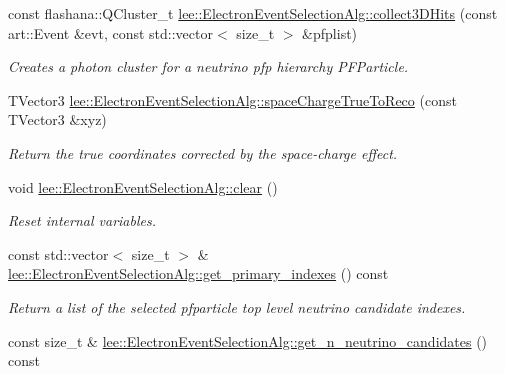\begin{DoxyCompactItemize}
const flashana\-::\-Q\-Cluster\-\_\-t \hyperlink{group__lee_ga06a3e470d9b2ca729d25822fac19e455}{lee\-::\-Electron\-Event\-Selection\-Alg\-::collect3\-D\-Hits} (const art\-::\-Event \&evt, const std\-::vector$<$ size\-\_\-t $>$ \&pfplist)
\begin{DoxyCompactList}\small\item\em Creates a photon cluster for a neutrino pfp hierarchy P\-F\-Particle. \end{DoxyCompactList}\item 
T\-Vector3 \hyperlink{group__lee_gafb99143e1546158d3f030724694e6a51}{lee\-::\-Electron\-Event\-Selection\-Alg\-::space\-Charge\-True\-To\-Reco} (const T\-Vector3 \&xyz)
\begin{DoxyCompactList}\small\item\em Return the true coordinates corrected by the space-\/charge effect. \end{DoxyCompactList}\item 
\hypertarget{group__lee_gad936812d5e9dc7999a37c75b84b04ada}{void \hyperlink{group__lee_gad936812d5e9dc7999a37c75b84b04ada}{lee\-::\-Electron\-Event\-Selection\-Alg\-::clear} ()}\label{group__lee_gad936812d5e9dc7999a37c75b84b04ada}

\begin{DoxyCompactList}\small\item\em Reset internal variables. \end{DoxyCompactList}\item 
\hypertarget{group__lee_ga317c107f710fc965cd7e062ac933d3df}{const std\-::vector$<$ size\-\_\-t $>$ \& \hyperlink{group__lee_ga317c107f710fc965cd7e062ac933d3df}{lee\-::\-Electron\-Event\-Selection\-Alg\-::get\-\_\-primary\-\_\-indexes} () const }\label{group__lee_ga317c107f710fc965cd7e062ac933d3df}

\begin{DoxyCompactList}\small\item\em Return a list of the selected pfparticle top level neutrino candidate indexes. \end{DoxyCompactList}\item 
\hypertarget{group__lee_ga6259851e755db48eb0dd831708212e27}{const size\-\_\-t \& \hyperlink{group__lee_ga6259851e755db48eb0dd831708212e27}{lee\-::\-Electron\-Event\-Selection\-Alg\-::get\-\_\-n\-\_\-neutrino\-\_\-candidates} () const }\label{group__lee_ga6259851e755db48eb0dd831708212e27}


\end{DoxyCompactItemize}
